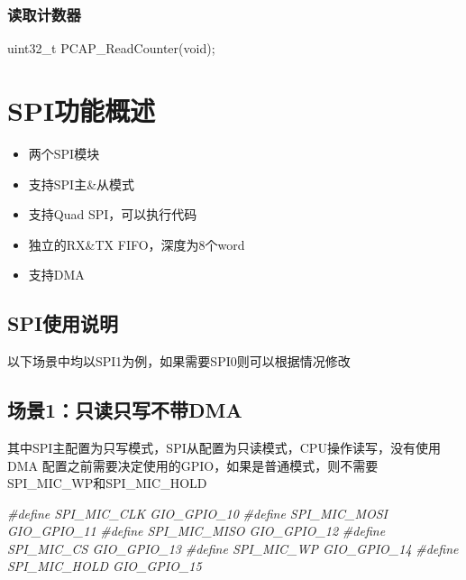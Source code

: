 \documentclass[
  12pt,
]{book}
\newenvironment{Shaded}{\begin{snugshade}}{\end{snugshade}}
\newcommand{\DataTypeTok}[1]{\textcolor[rgb]{0.13,0.29,0.53}{#1}}
\newcommand{\NormalTok}[1]{#1}
\newcommand{\PreprocessorTok}[1]{\textcolor[rgb]{0.56,0.35,0.01}{\textit{#1}}}
\providecommand{\tightlist}{%
  \setlength{\itemsep}{0pt}\setlength{\parskip}{0pt}}
\begin{document}
\hypertarget{ux8bfbux53d6ux8ba1ux6570ux5668}{%
\subsection{读取计数器}\label{ux8bfbux53d6ux8ba1ux6570ux5668}}

\begin{Shaded}
\begin{Highlighting}[]
\DataTypeTok{uint32_t}\NormalTok{ PCAP_ReadCounter(}\DataTypeTok{void}\NormalTok{);}
\end{Highlighting}
\end{Shaded}

\hypertarget{spiux529fux80fdux6982ux8ff0}{%
\chapter{SPI功能概述}\label{spiux529fux80fdux6982ux8ff0}}

\begin{itemize}
\tightlist
\item
  两个SPI模块
\item
  支持SPI主\&从模式
\item
  支持Quad SPI，可以执行代码
\item
  独立的RX\&TX FIFO，深度为8个word
\item
  支持DMA
\end{itemize}

\hypertarget{spiux4f7fux7528ux8bf4ux660e}{%
\section{SPI使用说明}\label{spiux4f7fux7528ux8bf4ux660e}}

以下场景中均以SPI1为例，如果需要SPI0则可以根据情况修改

\hypertarget{ux573aux666f1ux53eaux8bfbux53eaux5199ux4e0dux5e26dma}{%
\section{场景1：只读只写不带DMA}\label{ux573aux666f1ux53eaux8bfbux53eaux5199ux4e0dux5e26dma}}

其中SPI主配置为只写模式，SPI从配置为只读模式，CPU操作读写，没有使用DMA 配置之前需要决定使用的GPIO，如果是普通模式，则不需要SPI\_MIC\_WP和SPI\_MIC\_HOLD

\begin{Shaded}
\begin{Highlighting}[]
\PreprocessorTok{#define SPI_MIC_CLK         GIO_GPIO_10}
\PreprocessorTok{#define SPI_MIC_MOSI        GIO_GPIO_11}
\PreprocessorTok{#define SPI_MIC_MISO        GIO_GPIO_12}
\PreprocessorTok{#define SPI_MIC_CS          GIO_GPIO_13}
\PreprocessorTok{#define SPI_MIC_WP          GIO_GPIO_14}
\PreprocessorTok{#define SPI_MIC_HOLD        GIO_GPIO_15}
\end{Highlighting}
\end{Shaded}
\end{document}
